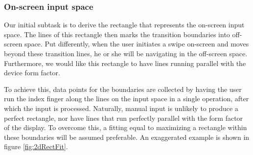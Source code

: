 \subsubsection{On-screen input space}

Our initial subtask is to derive the rectangle that represents the on-screen input space. The lines of this rectangle then marks the transition boundaries into off-screen space. Put differently, when the user initiates a swipe on-screen and moves beyond these transition lines, he or she will be navigating in the off-screen space. Furthermore, we would like this rectangle to have lines running parallel with the device form factor. 

To achieve this, data points for the boundaries are collected by having the user run the index finger along the lines on the input space in a single operation, after which the input is processed. Naturally, manual input is unlikely to produce a perfect rectangle, nor have lines that run perfectly parallel with the form factor of the display. To overcome this, a fitting equal to maximizing a rectangle within these boundaries will be assumed preferable. An exaggerated example is shown in figure \ref{fig:2dRectFit}. %

